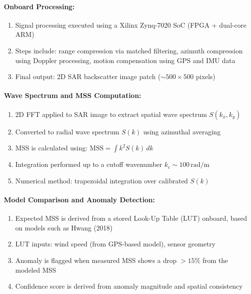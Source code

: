 \documentclass[12pt]{article}
\begin{document}
\paragraph{Onboard Processing:}
\begin{enumerate}
    \item Signal processing executed using a Xilinx Zynq-7020 SoC (FPGA + dual-core ARM)
    \item Steps include: range compression via matched filtering, azimuth compression using Doppler processing, motion compensation using GPS and IMU data
    \item Final output: 2D SAR backscatter image patch ($\sim 500 \times 500$ pixels)
\end{enumerate}
\paragraph{Wave Spectrum and MSS Computation:}
\begin{enumerate}
    \item 2D FFT applied to SAR image to extract spatial wave spectrum $S(k_x, k_y)$
    \item Converted to radial wave spectrum $S(k)$ using azimuthal averaging
    \item MSS is calculated using: $\text{MSS} = \int k^2 S(k) \, dk$
    \item Integration performed up to a cutoff wavenumber $k_c \sim 100 \, \text{rad/m}$
    \item Numerical method: trapezoidal integration over calibrated $S(k)$
\end{enumerate}
\paragraph{Model Comparison and Anomaly Detection:}
\begin{enumerate}
    \item Expected MSS is derived from a stored Look-Up Table (LUT) onboard, based on models such as Hwang (2018)
    \item LUT inputs: wind speed (from GPS-based model), sensor geometry
    \item Anomaly is flagged when measured MSS shows a drop $>15\%$ from the modeled MSS
    \item Confidence score is derived from anomaly magnitude and spatial consistency
\end{enumerate}
\end{document}
